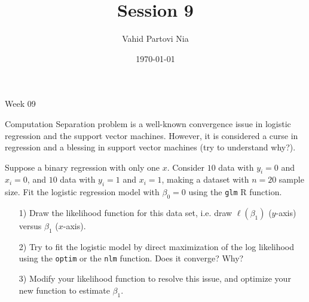 
\title{Session 9}
\author{Vahid Partovi Nia}
\date{\today}

\begin{center}
\Huge Week 09
\end{center}

\begin{slide}{Computation}
Separation problem is a well-known convergence issue in logistic regression and the support vector machines. However, it is considered a curse in regression and a blessing in support vector machines (try to understand why?).

Suppose a binary regression with only one $x$. 
Consider $10$ data with $y_i=0$ and $x_i=0$, and $10$ data with $y_i=1$
and $x_i=1$, making a dataset with $n=20$ sample size. 
Fit the logistic regression model with $\beta_0=0$ using the \texttt{glm} R function.

\begin{itemize}
\item[1)]Draw the likelihood function for this data set, i.e. draw $\ell(\beta_1)$ ($y$-axis) versus $\beta_1$ ($x$-axis).
\item[2)] Try to fit the logistic model by direct maximization of the log likelihood using the \texttt{optim} or the \texttt{nlm} function. 
Does it converge? Why?
\item[3)] Modify your likelihood function to resolve this issue, and optimize your new function to estimate $\beta_1$. 
\end{itemize}
\end{slide}



